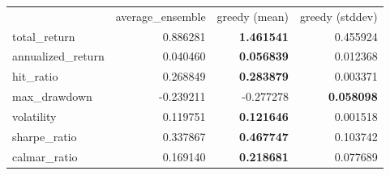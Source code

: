 \begin{tabular}{lrrr}
 & average_ensemble & greedy (mean) & greedy (stddev) \\
total_return & 0.886281 & \bfseries 1.461541 & 0.455924 \\
annualized_return & 0.040460 & \bfseries 0.056839 & 0.012368 \\
hit_ratio & 0.268849 & \bfseries 0.283879 & 0.003371 \\
max_drawdown & -0.239211 & -0.277278 & \bfseries 0.058098 \\
volatility & 0.119751 & \bfseries 0.121646 & 0.001518 \\
sharpe_ratio & 0.337867 & \bfseries 0.467747 & 0.103742 \\
calmar_ratio & 0.169140 & \bfseries 0.218681 & 0.077689 \\
\end{tabular}
